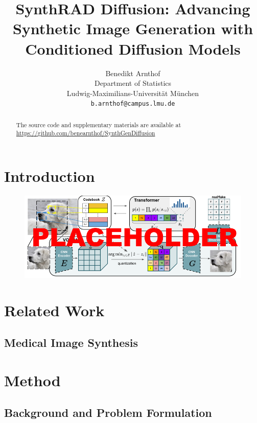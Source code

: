 \documentclass{article}
\title{SynthRAD Diffusion: Advancing Synthetic Image Generation with Conditioned Diffusion Models}
\author{
  Benedikt Arnthof\\
  Department of Statistics\\
  Ludwig-Maximilians-Universität München\\
  \texttt{b.arnthof@campus.lmu.de} \\
}
\begin{document}
\renewcommand{\figurename}{Fig.}
\maketitle

\begin{abstract}

The source code and supplementary materials are available at {\url{https://github.com/benearnthof/SynthGenDiffusion}}
\end{abstract}

\section{Introduction}\label{intro}



\begin{figure}[h]
    \centering
    \includegraphics[width=\textwidth]{placeholder.PNG}
    \caption{}
    \label{fig:placeholder}
\end{figure}

\section{Related Work}\label{relwork}

\subsection{Medical Image Synthesis}



\section{Method}

\subsection{Background and Problem Formulation}\label{background}
\end{document}
